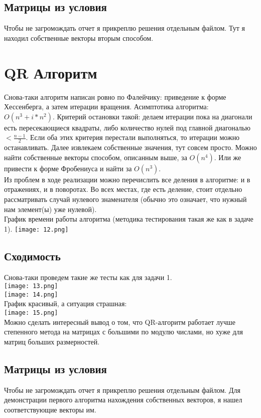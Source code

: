\documentclass[a4paper,12pt,fleqn]{article}
\begin{document}
\subsection{Матрицы из условия}
Чтобы не загромождать отчет я прикреплю решения отдельным файлом. Тут я находил собственные векторы вторым способом.


\section{QR Алгоритм}
Снова-таки алгоритм написан ровно по Фалейчику: приведение к форме Хессенберга, а затем итерации вращения. Асимптотика алгоритма: $O(n^3 + i * n^2)$. Критерий остановки такой: делаем итерации пока на диагонали есть пересекающиеся квадраты, либо количество нулей под главной диагональю $< \frac{n - 1}{2}$. Если оба этих критерия перестали выполняться, то итерации можно останавливать. Далее извлекаем собственные значения, тут совсем просто. Можно найти собственные векторы способом, описанным выше, за $O(n^4)$. Или же привести к форме Фробениуса и найти за $O(n^3)$.\\
Из проблем в ходе реализации можно перечислить все деления в алгоритме: и в отражениях, и в поворотах. Во всех местах, где есть деление, стоит отдельно рассматривать случай нулевого знаменателя (обычно это означает, что нужный нам элемент(ы) уже нулевой).\\
График времени работы алгоритма (методика тестирования такая же как в задаче 1).
\texttt{[image: 12.png]}\\

\subsection{Сходимость}
Снова-таки проведем такие же тесты как для задачи 1.\\
\texttt{[image: 13.png]}\\
\texttt{[image: 14.png]}\\
График красивый, а ситуация страшная:\\
\texttt{[image: 15.png]}\\
Можно сделать интересный вывод о том, что QR-алгоритм работает лучше степенного метода на матрицах с большими по модулю числами, но хуже для матриц больших размерностей.

\subsection{Матрицы из условия}
Чтобы не загромождать отчет я прикреплю решения отдельным файлом. Для демонстрации первого алгоритма нахождения собственных векторов, я нашел соответствующие векторы им.
\end{document}

